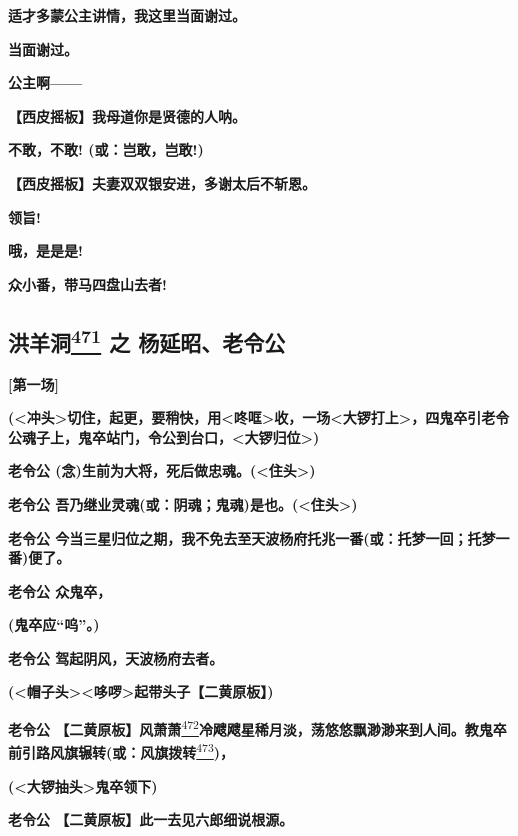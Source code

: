 \textbf{适才多蒙公主讲情，我这里当面谢过。}

\textbf{当面谢过。}

\textbf{公主啊------}

\textbf{【西皮摇板】我母道你是贤德的人呐。}

\textbf{不敢，不敢! (或：岂敢，岂敢!)}

\textbf{【西皮摇板】夫妻双双银安进，多谢太后不斩恩。}

\textbf{领旨!}

\textbf{哦，是是是!}

\textbf{众小番，带马四盘山去者!}

\newpage
\hypertarget{ux6d2aux7f8aux6d1e-ux4e4b-ux6768ux5ef6ux662dux8001ux4ee4ux516c}{%
\subsection{\texorpdfstring{洪羊洞\protect\hyperlink{fn471}{\textsuperscript{471}}
之
杨延昭、老令公}{洪羊洞471 之 杨延昭、老令公}}\label{ux6d2aux7f8aux6d1e-ux4e4b-ux6768ux5ef6ux662dux8001ux4ee4ux516c}}

\textbf{{[}第一场{]}}

\textbf{(\textless{}冲头\textgreater{}切住，起更，要稍快，用\textless{}咚哐\textgreater{}收，一场\textless{}大锣打上\textgreater{}，四鬼卒引老令公魂子上，鬼卒站门，令公到台口，\textless{}大锣归位\textgreater{})}

\textbf{老令公
(念)生前为大将，死后做忠魂。(\textless{}住头\textgreater{})}

\textbf{老令公
吾乃继业灵魂(或：阴魂；鬼魂)是也。(\textless{}住头\textgreater{})}

\textbf{老令公
今当三星归位之期，我不免去至天波杨府托兆一番(或：托梦一回；托梦一番)便了。}

\textbf{老令公 众鬼卒，}

\textbf{(鬼卒应``呜''。)}

\textbf{老令公 驾起阴风，天波杨府去者。}

\textbf{(\textless{}帽子头\textgreater{}\textless{}哆啰\textgreater{}起带头子【二黄原板】)}

\textbf{老令公
【二黄原板】风萧萧}\protect\hyperlink{fn472}{\textsuperscript{472}}\textbf{冷飕飕星稀月淡，荡悠悠飘渺渺来到人间。教鬼卒前引路风旗辗转(或：风旗拨转}\protect\hyperlink{fn473}{\textsuperscript{473}}\textbf{)，}

\textbf{(\textless{}大锣抽头\textgreater{}鬼卒领下)}

\textbf{老令公 【二黄原板】此一去见六郎细说根源。}

